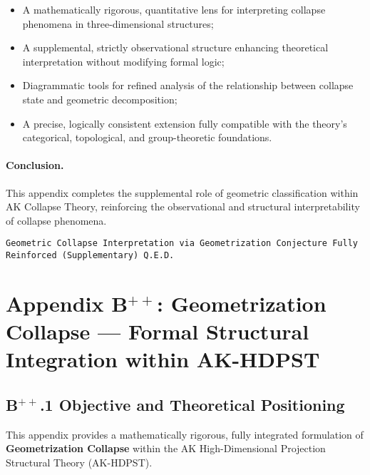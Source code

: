 \documentclass[11pt]{article}
\begin{document}
\begin{itemize}
    \item A mathematically rigorous, quantitative lens for interpreting collapse phenomena in three-dimensional structures;
    \item A supplemental, strictly observational structure enhancing theoretical interpretation without modifying formal logic;
    \item Diagrammatic tools for refined analysis of the relationship between collapse state and geometric decomposition;
    \item A precise, logically consistent extension fully compatible with the theory's categorical, topological, and group-theoretic foundations.
\end{itemize}

\paragraph{Conclusion.} This appendix completes the supplemental role of geometric classification within AK Collapse Theory, reinforcing the observational and structural interpretability of collapse phenomena.

\begin{flushright}
\texttt{Geometric Collapse Interpretation via Geometrization Conjecture \quad Fully Reinforced (Supplementary) \quad Q.E.D.}
\end{flushright}




\section*{Appendix B$^{++}$: Geometrization Collapse — Formal Structural Integration within AK-HDPST}

\subsection*{B$^{++}$.1 Objective and Theoretical Positioning}

This appendix provides a mathematically rigorous, fully integrated formulation of \textbf{Geometrization Collapse} within the AK High-Dimensional Projection Structural Theory (AK-HDPST).
\end{document}
